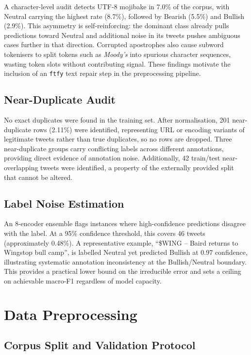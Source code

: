 \documentclass[11pt,a4paper]{article}
\begin{document}
A character-level audit detects UTF-8 mojibake in 7.0\% of the corpus, with Neutral
carrying the highest rate (8.7\%), followed by Bearish (5.5\%) and Bullish (2.9\%). This
asymmetry is self-reinforcing: the dominant class already pulls predictions toward Neutral
and additional noise in its tweets pushes ambiguous cases further in that direction.
Corrupted apostrophes also cause subword tokenisers to split tokens such as
\textit{Moody's} into spurious character sequences, wasting token slots without
contributing signal. These findings motivate the inclusion of an \texttt{ftfy} text repair
step in the preprocessing pipeline.

\subsection{Near-Duplicate Audit}

No exact duplicates were found in the training set. After normalisation, 201
near-duplicate rows (2.11\%) were identified, representing URL or encoding variants of
legitimate tweets rather than true duplicates, so no rows are dropped. Three
near-duplicate groups carry conflicting labels across different annotations, providing
direct evidence of annotation noise. Additionally, 42 train/test near-overlapping tweets
were identified, a property of the externally provided split that cannot be altered.

\subsection{Label Noise Estimation}

An 8-encoder ensemble flags instances where high-confidence predictions disagree with the
label. At a 95\% confidence threshold, this covers 46 tweets (approximately 0.48\%). A
representative example, ``\$WING -- Baird returns to Wingstop bull camp'', is labelled
Neutral yet predicted Bullish at 0.97 confidence, illustrating systematic annotation
inconsistency at the Bullish/Neutral boundary. This provides a practical lower bound on
the irreducible error and sets a ceiling on achievable macro-F1 regardless of model
capacity.


\section{Data Preprocessing}

\subsection{Corpus Split and Validation Protocol}
\end{document}
